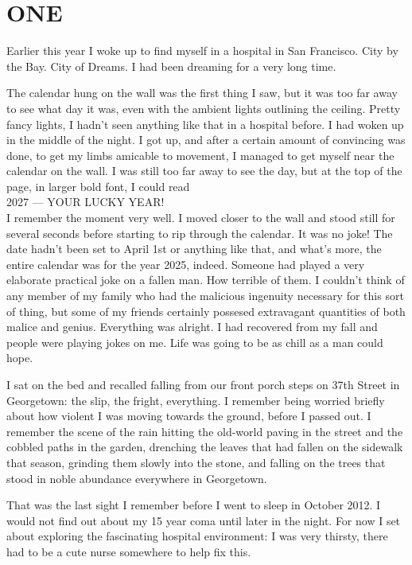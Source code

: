 \chapter*{ONE}

Earlier this year I woke up to find myself in a hospital in San Francisco. City by the Bay. City of Dreams. I had been dreaming for a very long time.

The calendar hung on the wall was the first thing I saw, but it was too far away to see what day it was, even with the ambient lights outlining the ceiling. Pretty fancy lights, I hadn't seen anything like that in a hospital before. I had woken up in the middle of the night. I got up, and after a certain amount of convincing was done, to get my limbs amicable to movement, I managed to get myself near the calendar on the wall. I was still too far away to see the day, but at the top of the page, in larger bold font, I could read\\


2027 --- YOUR LUCKY YEAR!
\\

\noindent
I remember the moment very well. I moved closer to the wall and stood still for several seconds before starting to rip through the calendar. It was no joke! The date hadn't been set to April 1st or anything like that, and what's more, the entire calendar was for the year 2025, indeed. Someone had played a very elaborate practical joke on a fallen man. How terrible of them. I couldn't think of any member of my family who had the malicious ingenuity necessary for this sort of thing, but some of my friends certainly possesed extravagant quantities of both malice and genius. Everything was alright. I had recovered from my fall and people were playing jokes on me. Life was going to be as chill as a man could hope.

I sat on the bed and recalled falling from our front porch steps on 37th Street in Georgetown: the slip, the fright, everything. I remember being worried briefly about how violent I was moving towards the ground, before I passed out. I remember the scene of the rain hitting the old-world paving in the street and the cobbled paths in the garden, drenching the leaves that had fallen on the sidewalk that season, grinding them slowly into the stone, and falling on the trees that stood in noble abundance everywhere in Georgetown.

That was the last sight I remember before I went to sleep in October 2012. I would not find out about my 15 year coma until later in the night. For now I set about exploring the fascinating hospital environment: I was very thirsty, there had to be a cute nurse somewhere to help fix this.

